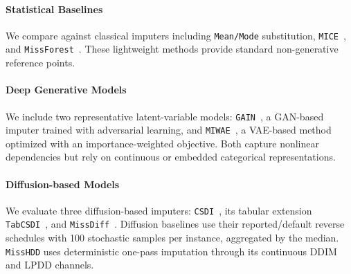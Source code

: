 \documentclass[times, review, 10pt]{elsarticle}
\begin{document}

\paragraph{Statistical Baselines}
We compare against classical imputers including \texttt{Mean/Mode}
substitution, \texttt{MICE}~\cite{mice}, and \texttt{MissForest}~\cite{missforest}.
These lightweight methods provide standard non-generative reference points.

\paragraph{Deep Generative Models}
We include two representative latent-variable models: \texttt{GAIN}~\cite{yoon2018gain},
a GAN-based imputer trained with adversarial learning, and \texttt{MIWAE}~\cite{mattei2019miwae},
a VAE-based method optimized with an importance-weighted objective.
Both capture nonlinear dependencies but rely on continuous or embedded
categorical representations.

\paragraph{Diffusion-based Models}
We evaluate three diffusion-based imputers: \texttt{CSDI}~\cite{csdi}, its
tabular extension \texttt{TabCSDI}~\cite{tabcsdi}, and \texttt{MissDiff}~\cite{missdiff}.
Diffusion baselines use their reported/default reverse schedules with 100
stochastic samples per instance, aggregated by the median. \texttt{MissHDD}
uses deterministic one-pass imputation through its continuous DDIM and LPDD
channels.




\end{document}
